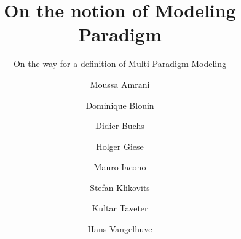 \documentclass[smallcondensed]{svjour3}     %
\begin{document}
\title{On the notion of Modeling Paradigm%
}
\subtitle{On the way for a definition of Multi Paradigm Modeling}


\author{
        Moussa Amrani \and
        Dominique Blouin \and
        Didier Buchs \and
        Holger Giese \and
        Mauro Iacono \and
        Stefan Klikovits \and
        Kultar Taveter \and
        Hans Vangelhuve %
}

\end{document}
